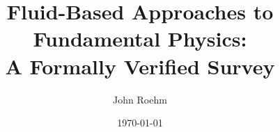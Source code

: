 \documentclass[aps,prd,reprint,nofootinbib,superscriptaddress]{revtex4-2}
\begin{document}
\title{Fluid-Based Approaches to Fundamental Physics:\\
A Formally Verified Survey}

\author{John Roehm}

\date{\today}

\begin{abstract}


\end{abstract}
\end{document}
